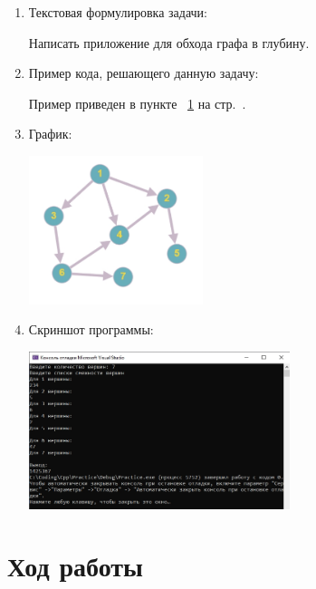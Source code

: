 \documentclass[12pt,a4paper]{scrartcl}
\begin{document}
\begin{enumerate}
 \item Текстовая формулировка задачи:

Написать приложение для обхода графа в глубину.
 \item Пример кода, решающего данную задачу:

Пример приведен в пункте ~\ref{sec:exp} на стр.~\pageref{sec:exp}.
 \item График:

\includegraphics[width=0.4\textwidth]{graph.jpg}
 \item Скриншот программы:

\includegraphics[width=0.6\textwidth]{screen.jpg}

\end{enumerate}

\section{Ход работы}
\label{sec:exp}
\end{document}
